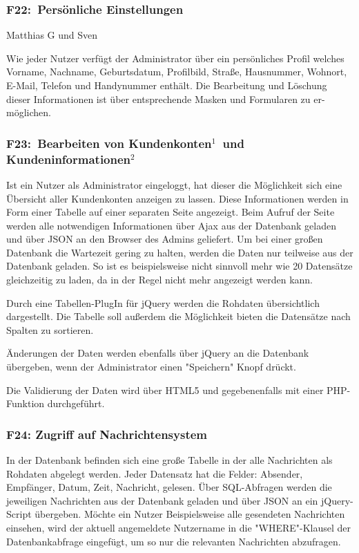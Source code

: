 \documentclass[10pt,a4paper]{scrartcl}
\begin{document}
\subsubsection*{F22: Persönliche Einstellungen}

Matthias G und Sven

Wie jeder Nutzer verfügt der Administrator über ein persönliches Profil welches Vorname, Nachname, Geburtsdatum, Profilbild, Straße, Hausnummer, Wohnort, E-Mail, Telefon und Handynummer enthält. Die Bearbeitung und Löschung dieser Informationen ist über entsprechende Masken und Formularen zu er-möglichen.

\subsubsection*{F23: Bearbeiten von Kundenkonten$^1$ und Kundeninformationen$^2$}

Ist ein Nutzer als Administrator eingeloggt, hat dieser die Möglichkeit sich eine Übersicht
aller Kundenkonten anzeigen zu lassen. Diese Informationen werden in Form einer Tabelle auf 
einer separaten Seite angezeigt. Beim Aufruf der Seite werden alle notwendigen Informationen 
über Ajax aus der Datenbank geladen und über JSON an den Browser des Admins geliefert. Um
bei einer großen Datenbank die Wartezeit gering zu halten, werden die Daten nur teilweise
aus der Datenbank geladen. So ist es beispielsweise nicht sinnvoll mehr wie 20 Datensätze 
gleichzeitig zu laden, da in der Regel nicht mehr angezeigt werden kann.

Durch eine Tabellen-PlugIn für jQuery werden die Rohdaten übersichtlich dargestellt.
Die Tabelle soll außerdem die Möglichkeit bieten die Datensätze nach Spalten zu sortieren.

Änderungen der Daten werden ebenfalls über jQuery an die Datenbank übergeben, wenn der Administrator
einen "Speichern" Knopf drückt.

Die Validierung der Daten wird über HTML5 und gegebenenfalls mit einer PHP-Funktion durchgeführt.

\subsubsection*{F24: Zugriff auf Nachrichtensystem}

In der Datenbank befinden sich eine große Tabelle in der alle Nachrichten als Rohdaten abgelegt werden.
Jeder Datensatz hat die Felder: Absender, Empfänger, Datum, Zeit, Nachricht, gelesen.
Über SQL-Abfragen werden die jeweiligen Nachrichten aus der Datenbank geladen und über JSON an ein
jQuery-Script übergeben. Möchte ein Nutzer Beispielsweise alle gesendeten Nachrichten einsehen, wird
der aktuell angemeldete Nutzername in die "WHERE"-Klausel der Datenbankabfrage eingefügt, um so nur 
die relevanten Nachrichten abzufragen.
\end{document}
